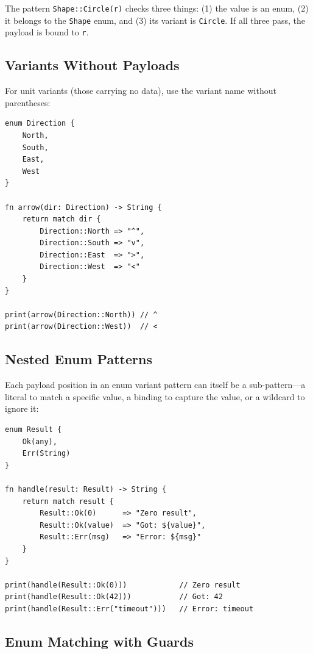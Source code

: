 The pattern \lstinline|Shape::Circle(r)| checks three things: (1) the value is an enum, (2) it belongs to the \lstinline|Shape| enum, and (3) its variant is \lstinline|Circle|. If all three pass, the payload is bound to \lstinline|r|.

\subsection{Variants Without Payloads}\label{sec:unit-variants}

For unit variants (those carrying no data), use the variant name without parentheses:

\begin{lstlisting}[language=Lattice, caption={Matching unit variants}]
enum Direction {
    North,
    South,
    East,
    West
}

fn arrow(dir: Direction) -> String {
    return match dir {
        Direction::North => "^",
        Direction::South => "v",
        Direction::East  => ">",
        Direction::West  => "<"
    }
}

print(arrow(Direction::North)) // ^
print(arrow(Direction::West))  // <
\end{lstlisting}

\subsection{Nested Enum Patterns}\label{sec:nested-enum}

Each payload position in an enum variant pattern can itself be a sub-pattern---a literal to match a specific value, a binding to capture the value, or a wildcard to ignore it:

\begin{lstlisting}[language=Lattice, caption={Sub-patterns in enum payloads}]
enum Result {
    Ok(any),
    Err(String)
}

fn handle(result: Result) -> String {
    return match result {
        Result::Ok(0)      => "Zero result",
        Result::Ok(value)  => "Got: ${value}",
        Result::Err(msg)   => "Error: ${msg}"
    }
}

print(handle(Result::Ok(0)))            // Zero result
print(handle(Result::Ok(42)))           // Got: 42
print(handle(Result::Err("timeout")))   // Error: timeout
\end{lstlisting}

\subsection{Enum Matching with Guards}\label{sec:enum-guards}

